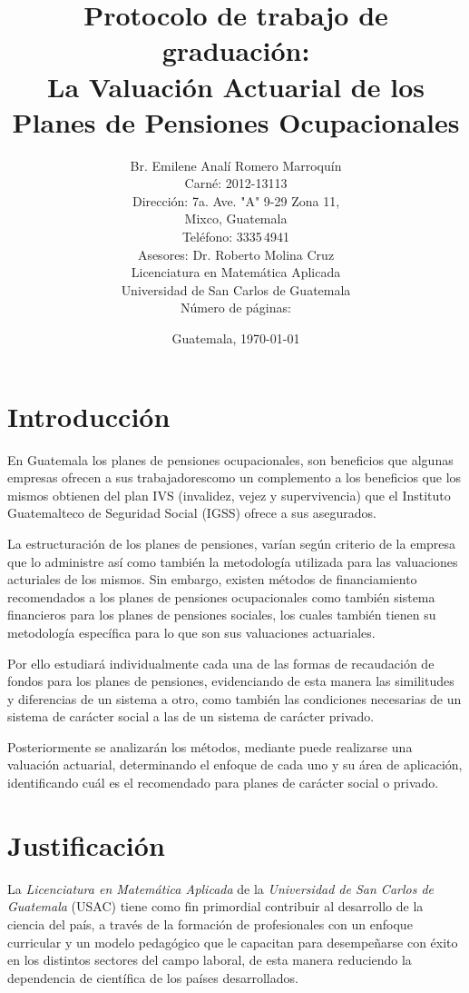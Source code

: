 \documentclass[12pt,letterpaper,titlepage]{article}
\title{Protocolo de trabajo de graduación:\\
La Valuación Actuarial de los Planes de Pensiones Ocupacionales}
\author{Br. Emilene Analí Romero Marroquín\\Carné: 2012-13113\\Dirección: 7a. Ave. "A" 9-29 Zona 11,\\Mixco, Guatemala\\Teléfono: 3335\,4941\\Asesores: Dr. Roberto Molina Cruz\\Licenciatura en Matemática Aplicada\\Universidad de San Carlos de Guatemala\\Número de páginas: \pageref{fin}}
\date{Guatemala, \today}
\begin{document}
\begin{titlepage}
\renewcommand{\thepage}{}
\pagestyle{empty}
\maketitle
\end{titlepage}\newpage
\setcounter{page}{2}
\tableofcontents
\newpage
\nocite{*}
\section{Introducción}

En Guatemala los planes de pensiones ocupacionales, son beneficios que algunas empresas ofrecen a sus trabajadorescomo un complemento a los beneficios que los mismos obtienen del plan IVS (invalidez, vejez y supervivencia) que el Instituto Guatemalteco de Seguridad Social (IGSS) ofrece a sus asegurados. 

La estructuración de los planes de pensiones, varían según criterio de la empresa que lo administre así como también la metodología utilizada para las valuaciones acturiales de los mismos. Sin embargo, existen métodos de financiamiento recomendados a los planes de pensiones ocupacionales como también sistema financieros para los planes de pensiones sociales, los cuales también tienen su metodología específica para lo que son sus valuaciones actuariales.

Por ello estudiará individualmente cada una de las formas de recaudación de fondos para los planes de pensiones, evidenciando de esta manera las similitudes y diferencias de un sistema a otro, como también las condiciones necesarias de un sistema de carácter social a las de un sistema de carácter privado.

Posteriormente se analizarán los métodos, mediante puede realizarse una valuación actuarial, determinando el enfoque de cada uno y su área de aplicación, identificando cuál es el recomendado para planes de carácter social o privado.




\newpage

\section{Justificación}

La \textit{Licenciatura en Matemática Aplicada} de la \textit{Universidad de San Carlos de Guatemala} (USAC) tiene como fin primordial contribuir al desarrollo de la ciencia del país, a través de la formación de profesionales con un enfoque curricular y un modelo pedagógico que le capacitan para desempeñarse con éxito en los distintos sectores del campo laboral, de esta manera reduciendo la dependencia de científica de los países desarrollados.\bigskip
\end{document}
